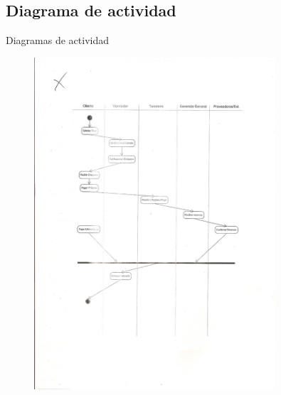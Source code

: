 \documentclass[12pt,a4paper,titlepage,oneside]{article}
\begin{document}
\newpage
\subsection{Diagrama de actividad}

Diagramas de actividad
\bigskip

\begin{figure}[htb]
\centerline{\includegraphics[width=0.8\textwidth]{escenario1}}
\label{fig:celda}
\end{figure}
\end{document}
